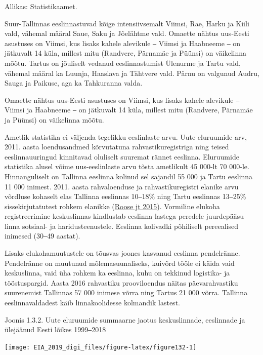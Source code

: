 \documentclass[estonian,]{article}
\begin{document}
\begin{imgsource}
{Allikas:} Statistikaamet.
\end{imgsource}

Suur-Tallinnas eeslinnastuvad kõige intensiivsemalt Viimsi, Rae, Harku ja Kiili vald, vähemal määral Saue, Saku ja Jõelähtme vald. Omaette nähtus uus-Eesti asustuses on Viimsi, kus lisaks kahele alevikule ‒ Viimsi ja Haabneeme ‒ on jätkuvalt 14 küla, millest mitu (Randvere, Pärnamäe ja Püünsi) on väikelinna mõõtu. Tartus on jõuliselt vedanud eeslinnastumist Ülenurme ja Tartu vald, vähemal määral ka Luunja, Haaslava ja Tähtvere vald. Pärnu on valgunud Audru, Sauga ja Paikuse, aga ka Tahkuranna valda.

\begin{blockquote-right}
Omaette nähtus uus-Eesti asustuses on Viimsi, kus lisaks kahele
alevikule ‒ Viimsi ja Haabneeme ‒ on jätkuvalt 14 küla, millest mitu
(Randvere, Pärnamäe ja Püünsi) on väikelinna mõõtu.
\end{blockquote-right}

Ametlik statistika ei väljenda tegelikku eeslinlaste arvu. Uute eluruumide arv, 2011. aasta loendusandmed kõrvutatuna rahvastikuregistriga ning teised eeslinnauuringud kinnitavad oluliselt suuremat rännet eeslinna. Eluruumide statistika alusel võime uus-eeslinlaste arvu tõsta ametlikult 45 000-lt 70 000-le. Hinnanguliselt on Tallinna eeslinna kolinud sel sajandil 55 000 ja Tartu eeslinna 11 000 inimest. 2011. aasta rahvaloenduse ja rahvastikuregistri elanike arvu võrdluse kohaselt elas Tallinna eeslinnas 10‒18\% ning Tartu eeslinnas 13‒25\% sissekirjutatutest rohkem elanikke (\protect\hyperlink{Roose}{Roose jt 2015}). Vormiline elukoha registreerimine keskuslinnas kindlustab eeslinna lastega peredele juurdepääsu linna sotsiaal- ja haridusteenustele. Eeslinna kolivadki põhiliselt pereealised inimesed (30‒49 aastat).

Lisaks elukohamuutustele on tõusvas joones kasvanud eeslinna pendelränne. Pendelränne on muutunud mõlemasuunaliseks, kuivõrd tööle ei käida vaid keskuslinna, vaid üha rohkem ka eeslinna, kuhu on tekkinud logistika- ja tööstuspargid. Aasta 2016 rahvastiku prooviloendus näitas päevarahvastiku suurenemist Tallinnas 57 000 inimese võrra ning Tartus 21 000 võrra. Tallinna eeslinnavaldadest käib linnakoolidesse kolmandik lastest.

{Joonis 1.3.2.} Uute eluruumide summaarne jaotus keskuslinnade, eeslinnade ja ülejäänud Eesti lõikes 1999‒2018

\begin{center}\texttt{[image: EIA\_2019\_digi\_files/figure-latex/figure132-1]} \end{center}
\end{document}
